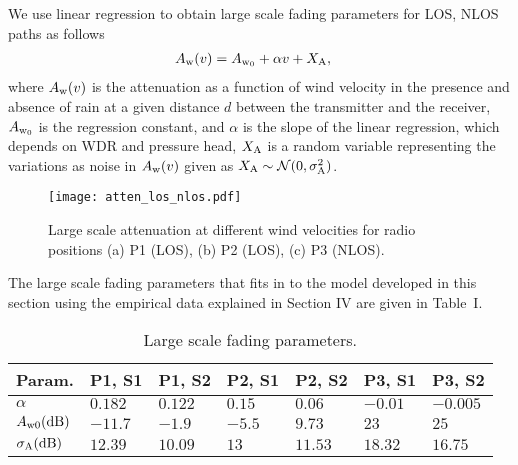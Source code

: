 \documentclass[conference]{IEEEtran}
\begin{document}
 We use linear regression to obtain large scale fading parameters for LOS, NLOS paths as follows
\begin{align}
A_{\rm w}(v) & = A_{\rm w_0} + \alpha v + X_{\rm A},  \label{Eq:Largescale} 
\end{align}
where $A_{\rm w}(v)$ is the attenuation as a function of wind velocity in the presence and absence of rain at a given distance $d$ between the transmitter and the receiver, $A_{\rm w_0}$ is the regression constant, and $\alpha$ is the slope of the linear regression, which depends on WDR and pressure head, $X_{\rm A}$ is a random variable representing the variations as noise in $A_{\rm w}(v)$ given as $X_{\rm A}\sim\mathcal{N}(0,\sigma_{\rm A}^2)$.
\begin{figure*}
 \center
 \vspace{-0.2 cm}
  \texttt{[image: atten\_los\_nlos.pdf]}
    \caption{Large scale attenuation at different wind velocities for radio positions (a) P1 (LOS), (b) P2 (LOS), (c) P3 (NLOS). }\label{Fig:atten_los_nlos}
  \vspace{-0.4cm}
\end{figure*}
The large scale fading parameters that fits in to the model developed in this section using the empirical data explained in Section IV are given in Table~I. 
\begin{table}[!t]
	\begin{center}
	\caption{Large scale fading parameters.}
    \vspace{-0.4 cm}
		\label{Table_I}
		\begin{tabular}{|P{1cm}|P{0.82cm}|P{0.82cm}|P{0.82cm}|P{0.82cm}|P{0.82cm}|P{0.82cm}|}
			\hline
			\textbf{Param.}&\textbf{P1, S1}&\textbf{P1, S2}&\textbf{P2, S1}&\textbf{P2, S2}&\textbf{P3, S1}&\textbf{P3, S2}\\
			\hline
			$\alpha$&$0.182$&$0.122$&$0.15$&$0.06$&$-0.01$&$-0.005$ \\
			\hline
		$A_{\rm w0}({\rm dB})$&$-11.7$&$-1.9$&$-5.5$&$9.73$&$23$&$25$ \\
			\hline
            $\sigma_{\rm A}({\rm dB})$&$12.39$&$10.09$&$13$&$11.53$&$18.32$&$16.75$\\
			\hline
			\end{tabular}
	\end{center}
\vspace{-0.2 cm}
\end{table}
\end{document}
